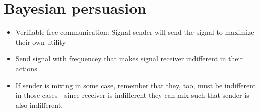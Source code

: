 \documentclass[11pt]{article} %
\begin{document}
\section{Bayesian persuasion}
\begin{itemize}
\item Verifiable free communication: Signal-sender will send the signal to maximize their own utility
\item Send signal with frequencey that makes signal receiver indifferent in their actions
\item If sender is mixing in some case, remember that they, too, must be indifferent in those cases - since receiver is indifferent they can mix such that sender is also indifferent.
\end{itemize}
\end{document}
